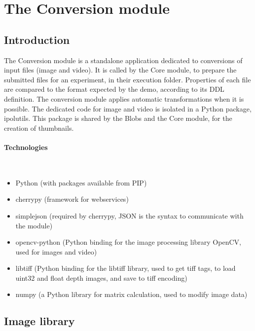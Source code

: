 \section{The Conversion module}
\label{sec:conversion}


\subsection{Introduction}
\label{sec:archive_introduction}

The Conversion module is a standalone application dedicated to conversions of input files (image and video). It is called by the Core module, to prepare the submitted files for an experiment, in their execution folder. Properties of each file are compared to the format expected by the demo, according to its DDL definition. The conversion module applies automatic transformations when it is possible. The dedicated code for image and video is isolated in a Python package, ipolutils. This package is shared by the Blobs and the Core module, for the creation of thumbnails.

\paragraph{Technologies} \hspace{0pt} \\
\begin{itemize}
\item Python (with packages available from PIP)
\item cherrypy (framework for webservices)
\item simplejson (required by cherrypy, JSON is the syntax to communicate with the module)
\item opencv-python (Python binding for the image processing library OpenCV, used for images and video)
\item libtiff (Python binding for the libtiff library, used to get tiff tags, to load uint32 and float depth images, and save to tiff encoding)
\item numpy (a Python library for matrix calculation, used to modify image data)
\end{itemize}


\subsection{Image library}

